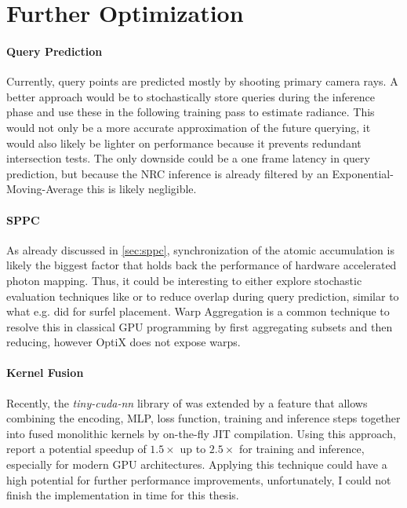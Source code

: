 \section{Further Optimization}

\paragraph{Query Prediction}
Currently, query points are predicted mostly by shooting primary camera rays.
A better approach would be to stochastically store queries during the inference phase and use these in the following training pass to estimate radiance.
This would not only be a more accurate approximation of the future querying, it would also likely be lighter on performance because it prevents redundant intersection tests.
The only downside could be a one frame latency in query prediction, but because the NRC inference is already filtered by an Exponential-Moving-Average this is likely negligible.

\paragraph{SPPC} As already discussed in \cref{sec:sppc}, synchronization of the atomic accumulation is likely the biggest factor that holds back the performance of hardware accelerated photon mapping.
Thus, it could be interesting to either explore stochastic evaluation techniques like \textcite{kern2023} or to reduce overlap during query prediction, similar to what e.g. \textcite{stachowiak2018} did for surfel placement.
Warp Aggregation is a common technique to resolve this in classical GPU programming by first aggregating subsets and then reducing, however OptiX does not expose warps.

\paragraph{Kernel Fusion} Recently, the \emph{tiny-cuda-nn} library of \textcite{muller2021a} was extended by a feature that allows combining the encoding, MLP, loss function, training and inference steps together into fused monolithic kernels by on-the-fly JIT compilation.
Using this approach, \textcite{muller2021a} report a potential speedup of $1.5\times$ up to $2.5\times$ for training and inference, especially for modern GPU architectures.
Applying this technique could have a high potential for further performance improvements, unfortunately, I could not finish the implementation in time for this thesis.